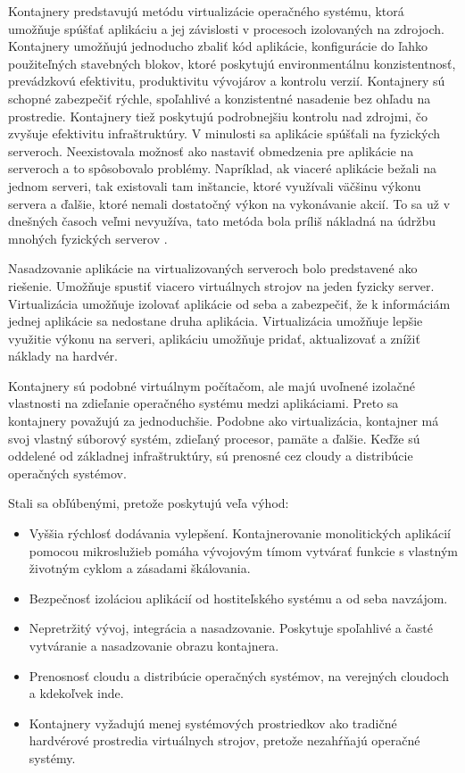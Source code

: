 Kontajnery predstavujú metódu virtualizácie operačného systému, ktorá umožňuje spúšťať aplikáciu a jej závislosti v procesoch izolovaných na zdrojoch. Kontajnery umožňujú jednoducho zbaliť kód aplikácie, konfigurácie do ľahko použiteľných stavebných blokov, ktoré poskytujú environmentálnu konzistentnosť, prevádzkovú efektivitu, produktivitu vývojárov a kontrolu verzií. Kontajnery sú schopné zabezpečiť rýchle, spoľahlivé a konzistentné nasadenie bez ohľadu na prostredie. Kontajnery tiež poskytujú podrobnejšiu kontrolu nad zdrojmi, čo zvyšuje efektivitu infraštruktúry. V minulosti sa aplikácie spúšťali na fyzických serveroch. Neexistovala možnosť ako nastaviť obmedzenia pre aplikácie na serveroch a to spôsobovalo problémy. Napríklad, ak viaceré aplikácie bežali na jednom serveri, tak existovali tam inštancie, ktoré využívali väčšinu výkonu servera a ďalšie, ktoré nemali dostatočný výkon na vykonávanie akcií. To sa už v dnešných časoch veľmi nevyužíva, tato metóda bola príliš nákladná na údržbu mnohých fyzických serverov \cite{container}.

Nasadzovanie aplikácie na virtualizovaných serveroch bolo predstavené ako riešenie. Umožňuje spustiť viacero virtuálnych strojov na jeden fyzicky server. Virtualizácia umožňuje izolovať aplikácie od seba a zabezpečiť, že k informáciám jednej aplikácie sa nedostane druha aplikácia. Virtualizácia umožňuje lepšie využitie výkonu na serveri, aplikáciu umožňuje pridať, aktualizovať a znížiť náklady na hardvér.

Kontajnery sú podobné virtuálnym počítačom, ale majú uvoľnené izolačné vlastnosti na zdieľanie operačného systému medzi aplikáciami. Preto sa kontajnery považujú za jednoduchšie. Podobne ako virtualizácia, kontajner má svoj vlastný súborový systém, zdieľaný procesor, pamäte a ďalšie. Keďže sú oddelené od základnej infraštruktúry, sú prenosné cez cloudy a distribúcie operačných systémov.

Stali sa obľúbenými, pretože poskytujú veľa výhod:

\begin{itemize}
    \item Vyššia rýchlosť dodávania vylepšení. Kontajnerovanie monolitických aplikácií pomocou mikroslužieb pomáha vývojovým tímom vytvárať funkcie s vlastným životným cyklom a zásadami škálovania.
	\item Bezpečnosť izoláciou aplikácií od hostiteľského systému a od seba navzájom.
	\item Nepretržitý vývoj, integrácia a nasadzovanie. Poskytuje spoľahlivé a časté vytváranie a nasadzovanie obrazu kontajnera.
	\item Prenosnosť cloudu a distribúcie operačných systémov, na verejných cloudoch a kdekoľvek inde.
	\item Kontajnery vyžadujú menej systémových prostriedkov ako tradičné hardvérové prostredia virtuálnych strojov, pretože nezahŕňajú operačné systémy.
\end{itemize}

